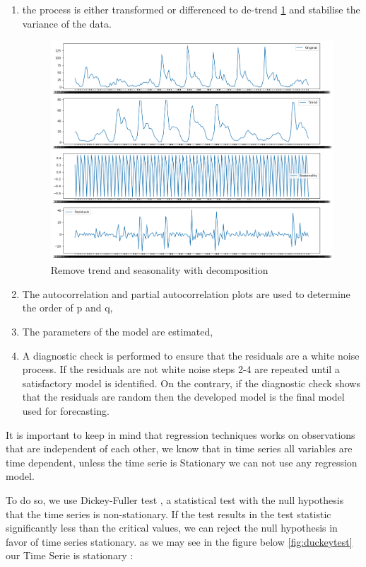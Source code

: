 \begin{enumerate}
    \item  the process is either transformed or
differenced to de-trend \ref{fig:detrend} and stabilise the variance of the data.
 

\begin{figure}[!h]
\centering
\includegraphics[scale=.45]{img/detreding.png} 
\caption{Remove trend and seasonality with decomposition }
\label{fig:detrend}
\end{figure}

\item The autocorrelation and partial autocorrelation plots are used to determine the order of p and q,
\item The parameters of the model are estimated,
\item A diagnostic check is performed to ensure that the residuals are a white noise process. If the residuals are not white noise steps 2-4 are repeated until a satisfactory model is identified. On the contrary, if the diagnostic check shows that the residuals are random then the developed model is the final model used for forecasting.
\end{enumerate}

It is important to keep in mind that regression techniques works on  observations that are independent of each other, we know that in time series all variables are time dependent, unless the time serie is Stationary we can not use any regression model.

To do so, we use  Dickey-Fuller test \cite{dickeyfuller}, a statistical test with the null hypothesis that the time series is non-stationary. If the test results in the test statistic significantly less than the critical values, we can reject the null hypothesis in favor of time series stationary.
as we may see in the figure below \ref{fig:duckeytest} our Time Serie is stationary :

